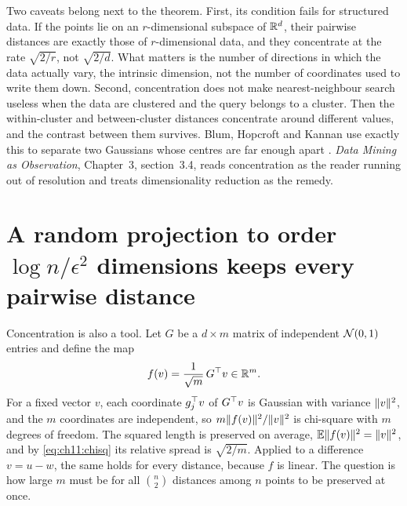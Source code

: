 Two caveats belong next to the theorem. First, its condition fails for structured data. If the points lie on an $r$-dimensional subspace of $\mathbb{R}^d$, their pairwise distances are exactly those of $r$-dimensional data, and they concentrate at the rate $\sqrt{2/r}$, not $\sqrt{2/d}$. What matters is the number of directions in which the data actually vary, the intrinsic dimension, not the number of coordinates used to write them down. Second, concentration does not make nearest-neighbour search useless when the data are clustered and the query belongs to a cluster. Then the within-cluster and between-cluster distances concentrate around different values, and the contrast between them survives. Blum, Hopcroft and Kannan use exactly this to separate two Gaussians whose centres are far enough apart \cite{blum2020}. \emph{Data Mining as Observation}, Chapter~3, section~3.4, reads concentration as the reader running out of resolution and treats dimensionality reduction as the remedy.


\section{A random projection to order \texorpdfstring{$\log n/\epsilon^2$}{log n / eps squared} dimensions keeps every pairwise distance}\label{sec:ch11:jl}

Concentration is also a tool. Let $G$ be a $d\times m$ matrix of independent $\mathcal{N}(0,1)$ entries and define the map
\begin{equation}\label{eq:ch11:proj}
f(v)=\frac{1}{\sqrt m}\,G^{\top} v\in\mathbb{R}^m .
\end{equation}
For a fixed vector $v$, each coordinate $g_j^{\top} v$ of $G^{\top} v$ is Gaussian with variance $\lVert v\rVert^2$, and the $m$ coordinates are independent, so $m\lVert f(v)\rVert^2/\lVert v\rVert^2$ is chi-square with $m$ degrees of freedom. The squared length is preserved on average, $\mathbb{E}\lVert f(v)\rVert^2=\lVert v\rVert^2$, and by \cref{eq:ch11:chisq} its relative spread is $\sqrt{2/m}$. Applied to a difference $v=u-w$, the same holds for every distance, because $f$ is linear. The question is how large $m$ must be for all $\binom n2$ distances among $n$ points to be preserved at once.

